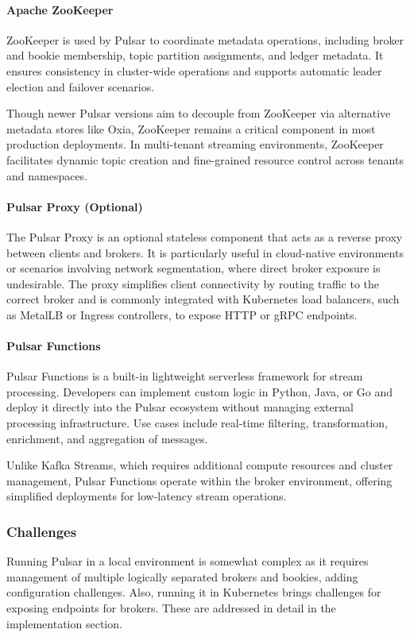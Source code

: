 \paragraph{Apache ZooKeeper}
ZooKeeper \cite{zookeeper-docs} is used by Pulsar to coordinate metadata operations, including broker and bookie membership, topic partition assignments, and ledger metadata. It ensures consistency in cluster-wide operations and supports automatic leader election and failover scenarios.

Though newer Pulsar versions aim to decouple from ZooKeeper via alternative metadata stores like Oxia, ZooKeeper remains a critical component in most production deployments. In multi-tenant streaming environments, ZooKeeper facilitates dynamic topic creation and fine-grained resource control across tenants and namespaces.

\paragraph{Pulsar Proxy (Optional)}
The Pulsar Proxy is an optional stateless component that acts as a reverse proxy between clients and brokers. It is particularly useful in cloud-native environments or scenarios involving network segmentation, where direct broker exposure is undesirable. The proxy simplifies client connectivity by routing traffic to the correct broker and is commonly integrated with Kubernetes load balancers, such as MetalLB or Ingress controllers, to expose HTTP or gRPC endpoints.

\paragraph{Pulsar Functions}
Pulsar Functions is a built-in lightweight serverless framework for stream processing. Developers can implement custom logic in Python, Java, or Go and deploy it directly into the Pulsar ecosystem without managing external processing infrastructure. Use cases include real-time filtering, transformation, enrichment, and aggregation of messages.

Unlike Kafka Streams, which requires additional compute resources and cluster management, Pulsar Functions operate within the broker environment, offering simplified deployments for low-latency stream operations.

\subsubsection{Challenges}
Running Pulsar in a local environment is somewhat complex as it requires management of multiple logically separated brokers and bookies, adding configuration challenges. Also, running it in Kubernetes brings challenges for exposing endpoints for brokers. These are addressed in detail in the implementation section.

